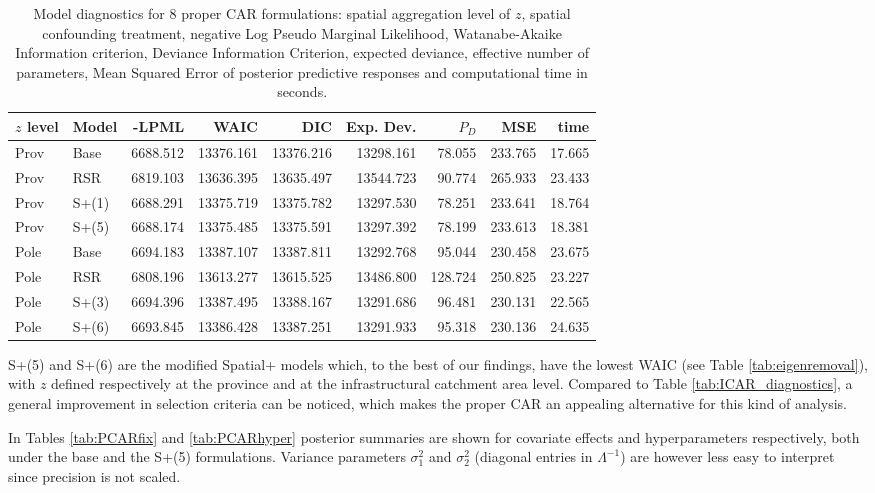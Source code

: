 \documentclass{book}
\begin{document}
\begin{appendices}
\begin{table}[ht]
\centering
\begin{tabular}{llrrrrrrr}
  \hline
  $z$ level & Model & -LPML & WAIC & DIC & Exp. Dev. & $P_D$ & MSE & time \\ 
  \hline  
  Prov & Base & 6688.512 & 13376.161 & 13376.216 & 13298.161 & 78.055 & 233.765 & 17.665 \\ 
  Prov & RSR &  6819.103 & 13636.395 & 13635.497 & 13544.723 & 90.774 & 265.933 & 23.433 \\ 
  Prov & S+(1) & 6688.291 & 13375.719 & 13375.782 & 13297.530 & 78.251 & 233.641 & 18.764 \\ 
  Prov & S+(5) & 6688.174 & 13375.485 & 13375.591 & 13297.392 & 78.199 & 233.613 & 18.381 \\  
  Pole & Base &  6694.183 & 13387.107 & 13387.811 & 13292.768 & 95.044 & 230.458 & 23.675 \\ 
  Pole & RSR & 6808.196 & 13613.277 & 13615.525 & 13486.800 & 128.724 & 250.825 & 23.227 \\ 
  Pole & S+(3)  & 6694.396 & 13387.495 & 13388.167 & 13291.686 & 96.481 & 230.131 & 22.565 \\ 
  Pole & S+(6) & 6693.845 & 13386.428 & 13387.251 & 13291.933 & 95.318 & 230.136 & 24.635 \\
   \hline
\end{tabular}
\caption{Model diagnostics for 8 proper CAR formulations: spatial aggregation level of $z$, spatial confounding treatment, negative Log Pseudo Marginal Likelihood, Watanabe-Akaike Information criterion, Deviance Information Criterion, expected deviance, effective number of parameters, Mean Squared Error of posterior predictive responses and computational time in seconds.}
\label{tab:PCAR}
\end{table}
S+(5) and S+(6) are the modified Spatial+ models which, to the best of our findings, have the lowest WAIC (see Table \ref{tab:eigenremoval}), with $z$ defined respectively at the province  and at the infrastructural catchment area level. Compared to Table \ref{tab:ICAR_diagnostics}, a general improvement in selection criteria can be noticed, which makes the proper CAR an appealing alternative for this kind of analysis.


In Tables \ref{tab:PCARfix} and \ref{tab:PCARhyper} posterior summaries are shown for covariate effects and hyperparameters respectively, both under the base and the S+(5) formulations. Variance parameters $\sigma_1^2$ and $\sigma_2^2$ (diagonal entries in $\Lambda^{-1}$) are however less easy to interpret since precision is not scaled.


\end{appendices}
\end{document}

